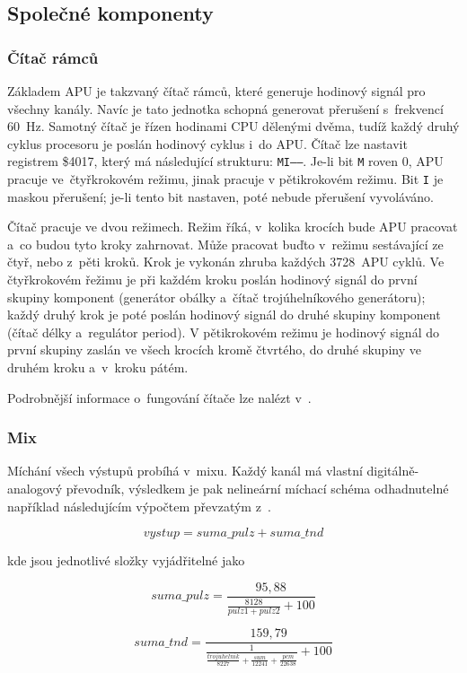 \subsection{Společné komponenty}
\subsubsection{Čítač rámců}
\label{sec:analyza-citac-ramcu}
Základem APU je takzvaný čítač rámců, které generuje hodinový signál pro všechny kanály. Navíc je tato jednotka schopná generovat přerušení s~frekvencí 60~Hz. Samotný čítač je řízen hodinami CPU dělenými dvěma, tudíž každý druhý cyklus procesoru je poslán hodinový cyklus i~do APU. Čítač lze nastavit registrem \$4017, který má následující strukturu: \texttt{MI------}. Je-li bit \texttt{M} roven 0, APU pracuje ve~čtyřkrokovém režimu, jinak pracuje v pětikrokovém režimu. Bit \texttt{I} je maskou přerušení; je-li tento bit nastaven, poté nebude přerušení vyvoláváno.~\cite{Nesdev:apu-frame-counter}

Čítač pracuje ve dvou režimech. Režim říká, v~kolika krocích bude APU pracovat a~co budou tyto kroky zahrnovat. Může pracovat buďto v~režimu sestávající ze čtyř, nebo z~pěti kroků. Krok je vykonán zhruba každých 3728~APU cyklů. Ve čtyřkrokovém řežimu je při každém kroku poslán hodinový signál do první skupiny komponent (generátor obálky a~čítač trojúhelníkového generátoru); každý druhý krok je poté poslán hodinový signál do druhé skupiny komponent (čítač délky a~regulátor period). V pětikrokovém režimu je hodinový signál do první skupiny zaslán ve všech krocích kromě čtvrtého, do druhé skupiny ve druhém kroku a~v~kroku pátém.~\cite{Nesdev:apu-frame-counter}

Podrobnější informace o~fungování čítače lze nalézt v~\cite{Nesdev:apu-frame-counter}.

\subsubsection{Mix}
Míchání všech výstupů probíhá v~mixu. Každý kanál má vlastní digitálně-analogový převodník, výsledkem je pak nelineární míchací schéma odhadnutelné například následujícím výpočtem převzatým z~\cite{Nesdev:apu-mixer}.

\[vystup = suma\_pulz + suma\_tnd\]
	
kde jsou jednotlivé složky vyjádřitelné jako
	
\[suma\_pulz = \frac{95,88}{\frac{8128}{pulz1 + pulz2} + 100}\]

\[suma\_tnd = \frac{159,79}{\frac{1}{\frac{trojuhelnik}{8227} + \frac{sum}{12241} + \frac{pcm}{22638}} + 100}\]


